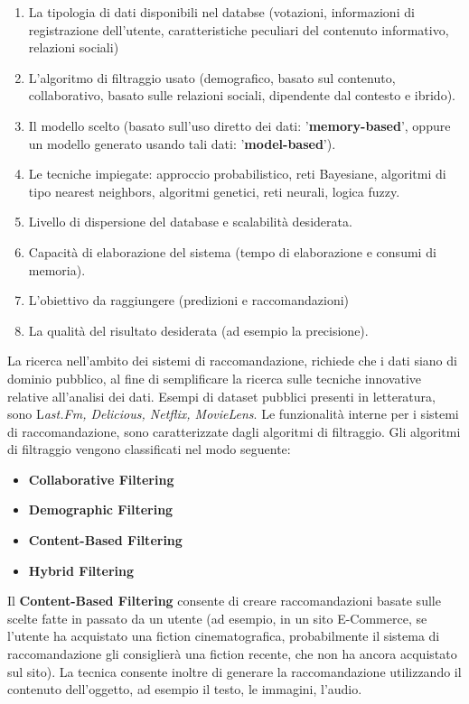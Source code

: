 \documentclass[12pt]{article}
\begin{document}
\begin{enumerate}
\item La tipologia di dati disponibili nel databse (votazioni, informazioni di registrazione dell'utente, caratteristiche peculiari del contenuto informativo, relazioni sociali)
\item L'algoritmo di filtraggio usato (demografico, basato sul contenuto, collaborativo, basato sulle relazioni sociali, dipendente dal contesto e ibrido).
\item Il modello scelto (basato sull'uso diretto dei dati: '\textbf{memory-based}', oppure un modello generato usando tali dati: '\textbf{model-based}').
\item Le tecniche impiegate: approccio probabilistico, reti Bayesiane, algoritmi di tipo nearest neighbors, algoritmi genetici, reti neurali, logica fuzzy.
\item Livello di dispersione del database e scalabilità desiderata.
\item Capacità di elaborazione del sistema (tempo di elaborazione e consumi di memoria).
\item L'obiettivo da raggiungere (predizioni e raccomandazioni)
\item La qualità del risultato desiderata (ad esempio la precisione).
\end{enumerate}

La ricerca nell'ambito dei sistemi di raccomandazione, richiede che i dati siano di dominio pubblico, al fine di semplificare la ricerca sulle tecniche innovative relative all'analisi dei dati. Esempi di dataset pubblici presenti in letteratura, sono L\textit{ast.Fm, Delicious, Netflix, MovieLens}.
Le funzionalità interne per i sistemi di raccomandazione, sono caratterizzate dagli algoritmi di filtraggio. 
Gli algoritmi di filtraggio vengono classificati nel modo seguente:
\begin{itemize}
	\item \textbf{Collaborative Filtering}
	\item \textbf{Demographic Filtering}
	\item \textbf{Content-Based Filtering}
	\item \textbf{Hybrid Filtering}
\end{itemize}

Il \textbf{Content-Based Filtering} consente di creare raccomandazioni basate sulle scelte fatte in passato da un utente (ad esempio, in un sito E-Commerce, se l'utente ha acquistato una fiction cinematografica, probabilmente il sistema di raccomandazione gli consiglierà una fiction recente, che non ha ancora acquistato sul sito). La tecnica consente inoltre di generare la raccomandazione utilizzando il contenuto dell'oggetto, ad esempio il testo, le immagini, l'audio.
\end{document}
